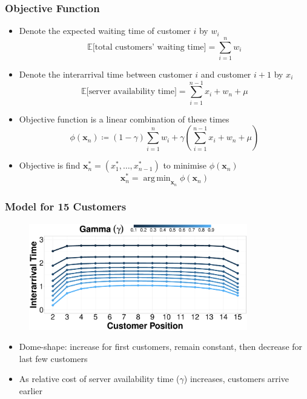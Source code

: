 \documentclass{beamer}
\DeclareMathOperator*{\argmin}{arg\,min}
\begin{document}
\begin{frame}
	\frametitle{Objective Function}

	\begin{itemize}
		\item Denote the expected waiting time of customer $i$ by $w_{i}$
		\begin{equation*}
			\mathbb{E} \Big[ \text{total customers' waiting time} \Big] = \sum_{i = 1}^{n} w_{i}
		\end{equation*}
		\item Denote the interarrival time between customer $i$ and customer $i + 1$ by $x_{i}$
		\begin{equation*}
			\mathbb{E} \Big[ \text{server availability time} \Big] = \sum_{i = 1}^{n - 1} x_{i} + w_{n} + \mu
		\end{equation*}
		\item \alert{Objective function} is a linear combination of these times
		\begin{equation*}
			\phi (\mathbf{x}_{n}) \coloneqq (1 - \gamma) \sum_{i = 1}^{n} w_{i} + \gamma \left( \sum_{i = 1}^{n - 1} x_{i} + w_{n} + \mu \right)
		\end{equation*}
		\item Objective is find $\mathbf{x}_{n}^{*} = (x_{1}^{*}, \ldots, x_{n - 1}^{*})$ to minimise $\phi (\mathbf{x}_{n})$
		\begin{equation*}
			\mathbf{x}_{n}^{*} = \argmin_{\mathbf{x}_{n}} \phi (\mathbf{x}_{n})
		\end{equation*}
	\end{itemize}
\end{frame}

\begin{frame}
	\frametitle{Model for 15 Customers}

	\begin{figure}
			\centering
			\includegraphics[width=0.85\textwidth]{Static_Line_Interarrival_Gamma.eps}
	\end{figure}

	\begin{itemize}
		\item \alert{Dome-shape}: increase for first customers, remain constant, then decrease for last few customers
		\item As relative cost of server availability time ($\gamma$) increases, customers arrive earlier
	\end{itemize}
\end{frame}
\end{document}
